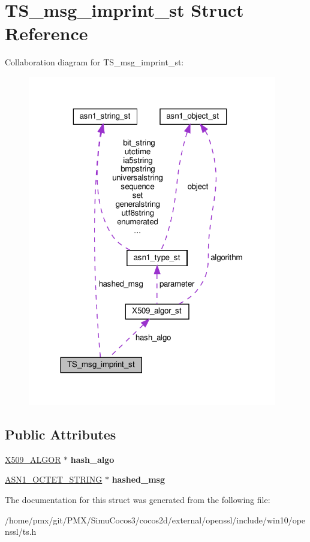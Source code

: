 \hypertarget{structTS__msg__imprint__st}{}\section{T\+S\+\_\+msg\+\_\+imprint\+\_\+st Struct Reference}
\label{structTS__msg__imprint__st}


Collaboration diagram for T\+S\+\_\+msg\+\_\+imprint\+\_\+st\+:
\nopagebreak
\begin{figure}[H]
\begin{center}
\leavevmode
\includegraphics[width=308pt]{structTS__msg__imprint__st__coll__graph}
\end{center}
\end{figure}
\subsection*{Public Attributes}
\begin{DoxyCompactItemize}
\item 
\mbox{\label{structTS__msg__imprint__st_aa0d4da96ba582b7b29ffe2acd192d10e}} 
\hyperlink{structX509__algor__st}{X509\+\_\+\+A\+L\+G\+OR} $\ast$ {\bfseries hash\+\_\+algo}
\item 
\mbox{\label{structTS__msg__imprint__st_a0be6581788c745f9e1d872c47d511dad}} 
\hyperlink{structasn1__string__st}{A\+S\+N1\+\_\+\+O\+C\+T\+E\+T\+\_\+\+S\+T\+R\+I\+NG} $\ast$ {\bfseries hashed\+\_\+msg}
\end{DoxyCompactItemize}


The documentation for this struct was generated from the following file\+:\begin{DoxyCompactItemize}
\item 
/home/pmx/git/\+P\+M\+X/\+Simu\+Cocos3/cocos2d/external/openssl/include/win10/openssl/ts.\+h\end{DoxyCompactItemize}
